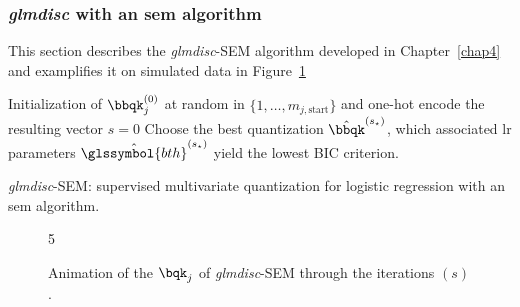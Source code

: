 \subsubsection{\textit{glmdisc} with an \gls{sem} algorithm} \label{app1:glmdiscSEM}

This section describes the \textit{glmdisc}-SEM algorithm developed in Chapter~\ref{chap4} and examplifies it on simulated data in Figure~\ref{fig:animSEM}

\begin{algorithm}[H]
 Initialization of $\bbqk_j^{(0)}$ at random in $\{1, \dots, m_{j,\text{start}}\}$ and one-hot encode the resulting vector\;
 $s = 0$\;
 Choose the best quantization $\hat{\bbqk}^{(s_\star)}$, which associated \gls{lr} parameters $\hat{\glssymbol{bth}}^{(s_\star)}$ yield the lowest BIC criterion.
 \caption{\label{SEM-disc} \textit{glmdisc}-SEM: supervised multivariate quantization for logistic regression with an \gls{sem} algorithm.}
\end{algorithm}

\begin{figure}[!h]
\begin{animateinline}[poster=first, controls=all, palindrome, autopause, autoresume, width=\textwidth, height=10cm]{5}
%
\end{animateinline}
\caption{\label{fig:animSEM} Animation of the $\bqk_j$ of \textit{glmdisc}-SEM through the iterations $(s)$.}
\end{figure}


